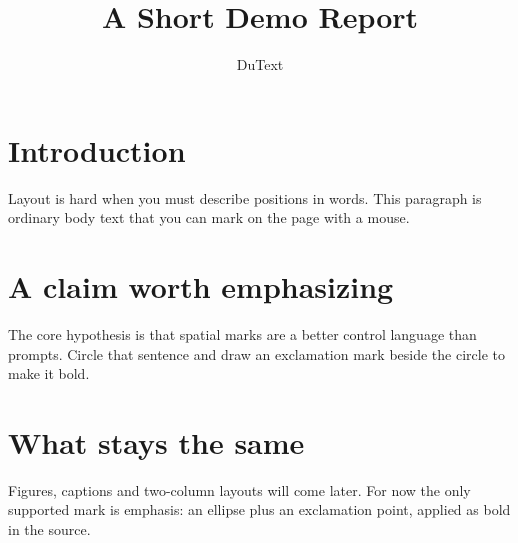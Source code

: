\documentclass[12pt,a4paper]{article}
\title{A Short Demo Report}
\author{DuText}
\date{}
\begin{document}
\maketitle

\section{Introduction}
Layout is hard when you must describe positions in words. This paragraph is ordinary body text that you can mark on the page with a mouse.

\section{A claim worth emphasizing}
The core hypothesis is that spatial marks are a better control language than prompts. Circle that sentence and draw an exclamation mark beside the circle to make it bold.

\section{What stays the same}
Figures, captions and two-column layouts will come later. For now the only supported mark is emphasis: an ellipse plus an exclamation point, applied as bold in the source.
\end{document}
